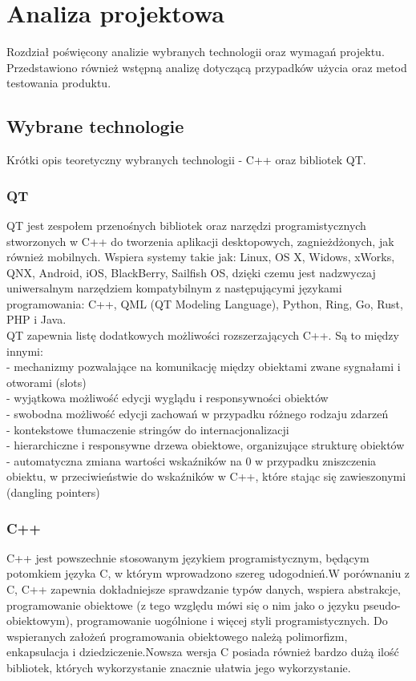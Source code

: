 \documentclass[twoside,a4paper]{book}
\begin{document}
\chapter{Analiza projektowa}
Rozdział poświęcony analizie wybranych technologii oraz wymagań projektu. Przedstawiono również wstępną analizę dotyczącą przypadków użycia oraz metod testowania produktu.
\section{Wybrane technologie}
Krótki opis teoretyczny wybranych technologii - C++ oraz bibliotek QT. 

\subsection{QT}

QT jest zespołem przenośnych bibliotek oraz narzędzi programistycznych stworzonych w C++ do tworzenia aplikacji desktopowych, zagnieżdżonych, jak również mobilnych. Wspiera systemy takie jak: Linux, OS X, Widows, xWorks, QNX, Android, iOS, BlackBerry, Sailfish OS, dzięki czemu jest nadzwyczaj uniwersalnym narzędziem kompatybilnym z następującymi językami programowania: C++, QML (QT Modeling Language), Python, Ring, Go, Rust, PHP i Java.~\cite{qtAbout}~\cite{qtLang}\\
QT zapewnia listę dodatkowych możliwości rozszerzających C++. Są to między innymi: \\
- mechanizmy pozwalające na komunikację między obiektami zwane sygnałami i otworami (slots)\\
- wyjątkowa możliwość edycji wyglądu i responsywności obiektów \\
- swobodna możliwość edycji zachowań w przypadku różnego rodzaju zdarzeń \\
- kontekstowe tłumaczenie stringów do internacjonalizacji\\
- hierarchiczne i responsywne drzewa obiektowe, organizujące strukturę obiektów\\
- automatyczna zmiana wartości wskaźników na 0 w przypadku zniszczenia obiektu, w przeciwieństwie do wskaźników w C++, które stając się zawieszonymi (dangling pointers) 
~\cite{qtLang}
\subsection{C++}

C++ jest powszechnie stosowanym językiem programistycznym, będącym potomkiem języka C, w którym wprowadzono szereg udogodnień.W porównaniu z C, C++ zapewnia dokładniejsze sprawdzanie typów danych, wspiera abstrakcje, programowanie obiektowe (z tego względu mówi się o nim jako o języku pseudo-obiektowym), programowanie uogólnione i więcej styli programistycznych. Do wspieranych założeń programowania obiektowego należą polimorfizm, enkapsulacja i dziedziczenie.Nowsza wersja C posiada również bardzo dużą ilość bibliotek, których wykorzystanie znacznie ułatwia jego wykorzystanie.
\end{document}
